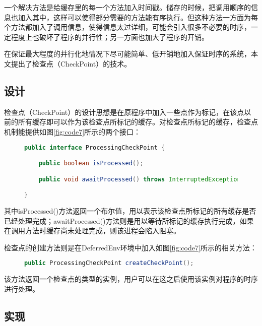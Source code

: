 一个解决方法是给缓存里的每一个方法加入时间戳。储存的时候，把调用顺序的信息也加入其中，这样可以使得部分需要的方法能有序执行。但这种方法一方面为每个方法都加入了调用信息，使得信息太过详细，可能会引入很多不必要的时序，一定程度上也破坏了程序的并行性；另一方面也加大了程序的开销。

在保证最大程度的并行化地情况下尽可能简单、低开销地加入保证时序的系统，本文提出了检查点（CheckPoint）的技术。

\subsection{设计}

检查点（CheckPoint）的设计思想是在原程序中加入一些点作为标记，在该点以前的所有缓存即可以作为该检查点所标记的缓存。对检查点所标记的缓存，检查点机制能提供如图\ref{fig:code7}所示的两个接口：

\begin{figure}[!htp]
\begin{lstlisting}[language=Java]
public interface ProcessingCheckPoint {

	public boolean isProcessed();

	public void awaitProcessed() throws InterruptedException;

}
\end{lstlisting}
\end{figure}

其中isProcessed()方法返回一个布尔值，用以表示该检查点所标记的所有缓存是否已经处理完成；awaitProcessed()方法则是用以等待所标记的缓存执行完成，如果在调用方法时缓存尚未处理完成，则该进程会陷入阻塞。

检查点的创建方法则是在DeferredEnv环境中加入如图\ref{fig:code7}所示的相关方法：

\begin{figure}[!htp]
\begin{lstlisting}[language=Java]
	public ProcessingCheckPoint createCheckPoint();
\end{lstlisting}
\end{figure}

该方法返回一个检查点的类型的实例，用户可以在这之后使用该实例对程序的时序进行处理。

\subsection{实现}

